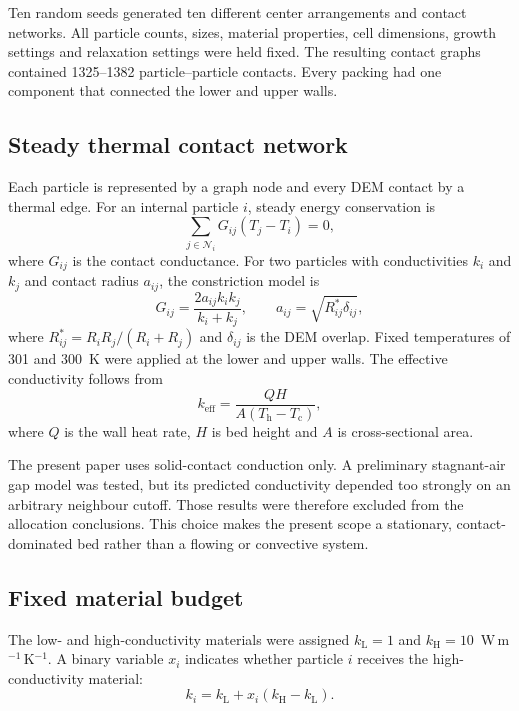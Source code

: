\documentclass[12pt,a4paper]{article}
\begin{document}
	Ten random seeds generated ten different center arrangements and contact
	networks. All particle counts, sizes, material properties, cell dimensions,
	growth settings and relaxation settings were held fixed. The resulting contact
	graphs contained 1325--1382 particle--particle contacts. Every packing had one
	component that connected the lower and upper walls.
	
	\subsection{Steady thermal contact network}
	
	Each particle is represented by a graph node and every DEM contact by a thermal
	edge. For an internal particle $i$, steady energy conservation is
	\begin{equation}
		\sum_{j\in\mathcal N_i}G_{ij}(T_j-T_i)=0,
		\label{eq:balance}
	\end{equation}
	where $G_{ij}$ is the contact conductance. For two particles with conductivities
	$k_i$ and $k_j$ and contact radius $a_{ij}$, the constriction model is
	\begin{equation}
		G_{ij}=\frac{2a_{ij}k_i k_j}{k_i+k_j},
		\qquad
		a_{ij}=\sqrt{R_{ij}^{*}\delta_{ij}},
		\label{eq:conductance}
	\end{equation}
	where $R_{ij}^{*}=R_iR_j/(R_i+R_j)$ and $\delta_{ij}$ is the DEM overlap. Fixed
	temperatures of 301 and 300~K were applied at the lower and upper walls. The
	effective conductivity follows from
	\begin{equation}
		k_{\mathrm{eff}}=\frac{QH}{A(T_{\mathrm h}-T_{\mathrm c})},
		\label{eq:keff}
	\end{equation}
	where $Q$ is the wall heat rate, $H$ is bed height and $A$ is cross-sectional
	area.
	
	The present paper uses solid-contact conduction only. A preliminary stagnant-air
	gap model was tested, but its predicted conductivity depended too strongly on
	an arbitrary neighbour cutoff. Those results were therefore excluded from the
	allocation conclusions. This choice makes the present scope a stationary,
	contact-dominated bed rather than a flowing or convective system.
	
	\subsection{Fixed material budget}
	
	The low- and high-conductivity materials were assigned
	$k_{\mathrm L}=1$ and $k_{\mathrm H}=10$~W\,m$^{-1}$\,K$^{-1}$. A binary
	variable $x_i$ indicates whether particle $i$ receives the high-conductivity
	material:
	\begin{equation}
		k_i=k_{\mathrm L}+x_i(k_{\mathrm H}-k_{\mathrm L}).
	\end{equation}
	
\end{document}
